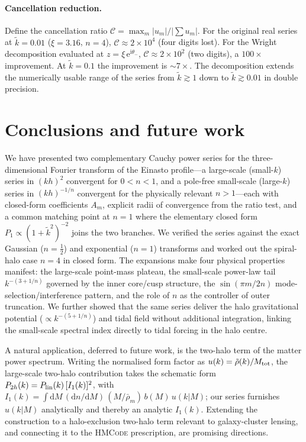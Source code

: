 \documentclass[aps,prd,onecolumn]{revtex4-2}
\newcommand{\kt}{\tilde{k}}          %
\begin{document}
\paragraph{Cancellation reduction.}
Define the cancellation ratio $\mathcal{C}=\max_m|u_m|/|\sum u_m|$.  For
the original real series at $\kt=0.01$ ($\xi=3.16$, $n=4$),
$\mathcal{C}\approx2\times10^4$ (four digits lost).  For the Wright
decomposition evaluated at $z=\xi\,\mathrm{e}^{\mathrm{i}\theta_-}$,
$\mathcal{C}\approx2\times10^2$ (two digits), a $100\times$ improvement.
At $\kt=0.1$ the improvement is $\sim7\times$.  The decomposition extends
the numerically usable range of the series from $\kt\gtrsim1$ down to
$\kt\gtrsim0.01$ in double precision.

\section{Conclusions and future work}
\label{sec:conclusions}

We have presented two complementary Cauchy power series for the
three-dimensional Fourier transform of the Einasto profile---a large-scale
(small-$k$) series in $(kh)^2$ convergent for $0<n<1$, and a pole-free
small-scale (large-$k$) series in $(kh)^{-1/n}$ convergent for the
physically relevant $n>1$---each with closed-form coefficients $A_m$,
explicit radii of convergence from the ratio test, and a common matching
point at $n=1$ where the elementary closed form
$P_1\propto(1+\kt^2)^{-2}$ joins the two branches.  We verified the series
against the exact Gaussian ($n=\tfrac12$) and exponential ($n=1$)
transforms and worked out the spiral-halo case $n=4$ in closed form.  The
expansions make four physical properties manifest: the large-scale
point-mass plateau, the small-scale power-law tail $k^{-(3+1/n)}$ governed
by the inner core/cusp structure, the $\sin(\pi m/2n)$
mode-selection/interference pattern, and the role of $n$ as the controller
of outer truncation.  We further showed that the same series deliver the
halo gravitational potential ($\propto k^{-(5+1/n)}$) and tidal field
without additional integration, linking the small-scale spectral index
directly to tidal forcing in the halo centre.

A natural application, deferred to future work, is the two-halo term of
the matter power spectrum.  Writing the normalised form factor as
$u(k)=\tilde\rho(k)/M_{\rm tot}$, the large-scale two-halo contribution
takes the schematic form
$P_{2h}(k)=P_{\rm lin}(k)\,[I_1(k)]^2$, with
$I_1(k)=\int\!\mathrm{d}M\,(\mathrm{d}n/\mathrm{d}M)\,(M/\bar\rho_m)\,
b(M)\,u(k|M)$;
our series furnishes $u(k|M)$ analytically and thereby an analytic
$I_1(k)$.  Extending the construction to a halo-exclusion two-halo term
relevant to galaxy-cluster lensing, and connecting it to the
\textsc{HMCode} prescription, are promising directions.
\end{document}
